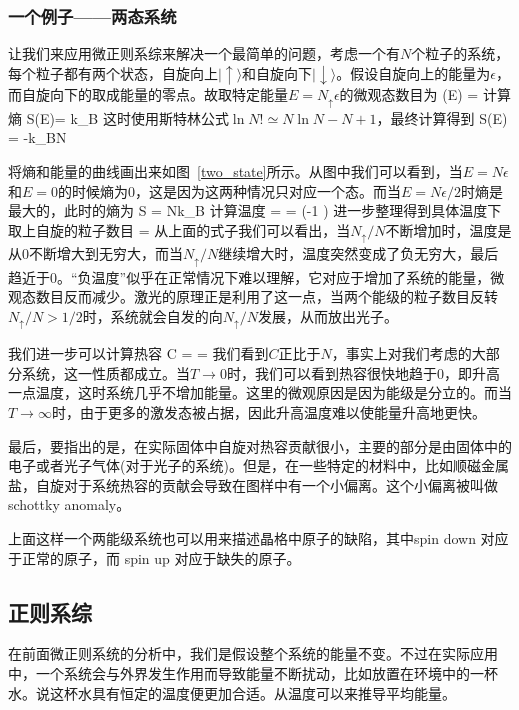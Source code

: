 \documentclass[11pt]{ctexart}
\begin{document}
\subsubsection{一个例子——两态系统}
让我们来应用微正则系综来解决一个最简单的问题，考虑一个有$N$个粒子的系统，每个粒子都有两个状态，自旋向上$|\uparrow\rangle$和自旋向下$|\downarrow\rangle$。假设自旋向上的能量为$\epsilon$，而自旋向下的取成能量的零点。故取特定能量$E = N_{\uparrow} \epsilon$的微观态数目为
\beq
\Omega(E) = 
\eeq
计算熵
\beq
S(E)= k_B \ln {}
\eeq
这时使用斯特林公式$\ln N! \simeq N\ln N -N+1$，最终计算得到
\beq
S(E) = -k_BN
\eeq
{}

将熵和能量的曲线画出来如图~\ref{two_state}所示。从图中我们可以看到，当$E = N\epsilon$和$E =0$的时候熵为0，这是因为这两种情况只对应一个态。而当$E = N\epsilon/2$时熵是最大的，此时的熵为
\beq
S = Nk_B
\eeq
计算温度
\beq
{} = = \ln (-1 )
\eeq
进一步整理得到具体温度下取上自旋的粒子数目
\beq
{} = 
\eeq
从上面的式子我们可以看出，当$N_\uparrow/N$不断增加时，温度是从0不断增大到无穷大，而当$N_\uparrow/N$继续增大时，温度突然变成了负无穷大，最后趋近于0。“负温度”似乎在正常情况下难以理解，它对应于增加了系统的能量，微观态数目反而减少。激光的原理正是利用了这一点，当两个能级的粒子数目反转$N_\uparrow/N>1/2$时，系统就会自发的向$N_\uparrow/N$发展，从而放出光子。

我们进一步可以计算热容
\beq
C =  = 
\eeq
我们看到$C$正比于$N$，事实上对我们考虑的大部分系统，这一性质都成立。当$T\rightarrow 0$时，我们可以看到热容很快地趋于0，即升高一点温度，这时系统几乎不增加能量。这里的微观原因是因为能级是分立的。而当$T\rightarrow \infty$时，由于更多的激发态被占据，因此升高温度难以使能量升高地更快。

最后，要指出的是，在实际固体中自旋对热容贡献很小，主要的部分是由固体中的电子或者光子气体(对于光子的系统)。但是，在一些特定的材料中，比如顺磁金属盐，自旋对于系统热容的贡献会导致在图样中有一个小偏离。这个小偏离被叫做schottky anomaly。

上面这样一个两能级系统也可以用来描述晶格中原子的缺陷，其中spin down 对应于正常的原子，而 spin up 对应于缺失的原子。


\newpage
\subsection{正则系综}
在前面微正则系统的分析中，我们是假设整个系统的能量不变。不过在实际应用中，一个系统会与外界发生作用而导致能量不断扰动，比如放置在环境中的一杯水。说这杯水具有恒定的温度便更加合适。从温度可以来推导平均能量。
\end{document}
